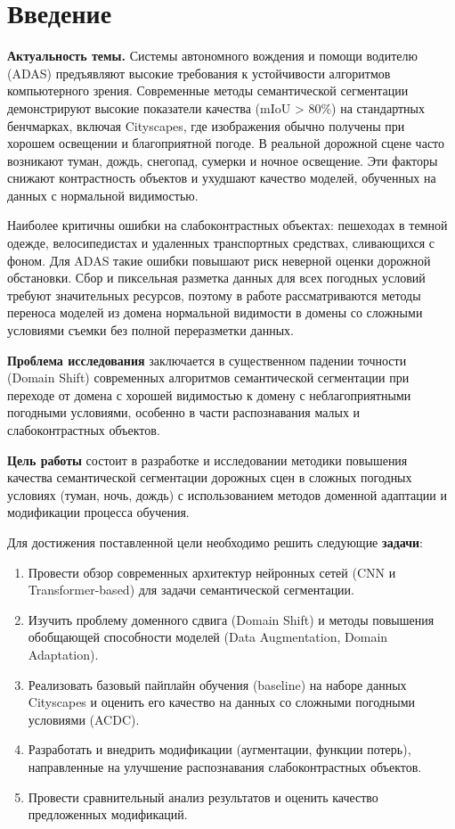 \documentclass[14pt,a4paper]{extarticle}
\begin{document}
\section*{Введение}

\textbf{Актуальность темы.} Системы автономного вождения и помощи водителю (ADAS) предъявляют высокие требования к устойчивости алгоритмов компьютерного зрения. Современные методы семантической сегментации демонстрируют высокие показатели качества (mIoU > 80\%) на стандартных бенчмарках, включая Cityscapes, где изображения обычно получены при хорошем освещении и благоприятной погоде. В реальной дорожной сцене часто возникают туман, дождь, снегопад, сумерки и ночное освещение. Эти факторы снижают контрастность объектов и ухудшают качество моделей, обученных на данных с нормальной видимостью.

Наиболее критичны ошибки на слабоконтрастных объектах: пешеходах в темной одежде, велосипедистах и удаленных транспортных средствах, сливающихся с фоном. Для ADAS такие ошибки повышают риск неверной оценки дорожной обстановки. Сбор и пиксельная разметка данных для всех погодных условий требуют значительных ресурсов, поэтому в работе рассматриваются методы переноса моделей из домена нормальной видимости в домены со сложными условиями съемки без полной переразметки данных.

\textbf{Проблема исследования} заключается в существенном падении точности (Domain Shift) современных алгоритмов семантической сегментации при переходе от домена с хорошей видимостью к домену с неблагоприятными погодными условиями, особенно в части распознавания малых и слабоконтрастных объектов.

\textbf{Цель работы} состоит в разработке и исследовании методики повышения качества семантической сегментации дорожных сцен в сложных погодных условиях (туман, ночь, дождь) с использованием методов доменной адаптации и модификации процесса обучения.

Для достижения поставленной цели необходимо решить следующие \textbf{задачи}:
\begin{enumerate}
    \item Провести обзор современных архитектур нейронных сетей (CNN и Transformer-based) для задачи семантической сегментации.
    \item Изучить проблему доменного сдвига (Domain Shift) и методы повышения обобщающей способности моделей (Data Augmentation, Domain Adaptation).
    \item Реализовать базовый пайплайн обучения (baseline) на наборе данных Cityscapes и оценить его качество на данных со сложными погодными условиями (ACDC).
    \item Разработать и внедрить модификации (аугментации, функции потерь), направленные на улучшение распознавания слабоконтрастных объектов.
    \item Провести сравнительный анализ результатов и оценить качество предложенных модификаций.
\end{enumerate}
\end{document}
